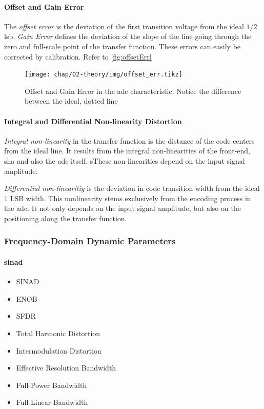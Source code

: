 \paragraph{Offset and Gain Error}
The \textit{offset error} is the deviation of the first transition voltage from the ideal $1/2$ \gls{lsb}. \textit{Gain Error} defines the deviation of the slope of the line going through the zero and full-scale point of the transfer function. These errors can easily be corrected by calibration. Refer to \autoref{fig:offsetErr}

\begin{figure}[H]
	\centering
	\texttt{[image: chap/02-theory/img/offset\_err.tikz]}
	\caption{Offset and Gain Error in the \gls{adc} characteristic. Notice the difference between the ideal, dotted line}
	\label{fig:offsetErr}
\end{figure}


\paragraph{Integral and Differential Non-linearity Distortion} 
\textit{Integral non-linearity} in the transfer function is the distance of the code centers from the ideal line. It results from the integral non-linearities of the front-end, \gls{sha} and also the \gls{adc} itself. sThese non-linearities depend on the input signal amplitude.

\textit{Differential non-linearitiy} is the deviation in code transition width from the ideal 1 LSB width. This nonlinearity stems exclusively from the encoding process in the \gls{adc}. It not only depends on the input signal amplitude, but also on the positioning along the transfer function.


\subsubsection{Frequency-Domain Dynamic Parameters}

\paragraph{\gls{sinad}}

\begin{itemize}
	\item SINAD
	\item ENOB
	\item SFDR
	\item Total Harmonic Distortion
	\item Intermodulation Distortion
	\item Effective Resolution Bandwidth
	\item Full-Power Bandwidth
	\item Full-Linear Bandwidth
\end{itemize}
